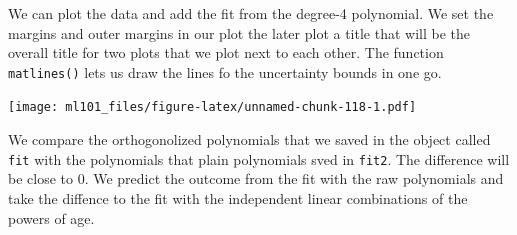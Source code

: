 \documentclass[]{article}
\newenvironment{Shaded}{\begin{snugshade}}{\end{snugshade}}
\newcommand{\CommentTok}[1]{\textcolor[rgb]{0.56,0.35,0.01}{\textit{#1}}}
\newcommand{\DataTypeTok}[1]{\textcolor[rgb]{0.13,0.29,0.53}{#1}}
\newcommand{\DecValTok}[1]{\textcolor[rgb]{0.00,0.00,0.81}{#1}}
\newcommand{\FloatTok}[1]{\textcolor[rgb]{0.00,0.00,0.81}{#1}}
\newcommand{\KeywordTok}[1]{\textcolor[rgb]{0.13,0.29,0.53}{\textbf{#1}}}
\newcommand{\NormalTok}[1]{#1}
\newcommand{\OperatorTok}[1]{\textcolor[rgb]{0.81,0.36,0.00}{\textbf{#1}}}
\newcommand{\OtherTok}[1]{\textcolor[rgb]{0.56,0.35,0.01}{#1}}
\newcommand{\StringTok}[1]{\textcolor[rgb]{0.31,0.60,0.02}{#1}}
\begin{document}
We can plot the data and add the fit from the degree-4 polynomial. We set the margins and outer margins in our plot the later plot a title that will be the overall title for two plots that we plot next to each other. The function \texttt{matlines()} lets us draw the lines fo the uncertainty bounds in one go.

\begin{Shaded}
\end{Shaded}

\texttt{[image: ml101\_files/figure-latex/unnamed-chunk-118-1.pdf]}

We compare the orthogonolized polynomials that we saved in the object called \texttt{fit} with the polynomials that plain polynomials sved in \texttt{fit2}. The difference will be close to \(0\). We predict the outcome from the fit with the raw polynomials and take the diffence to the fit with the independent linear combinations of the powers of age.
\end{document}
